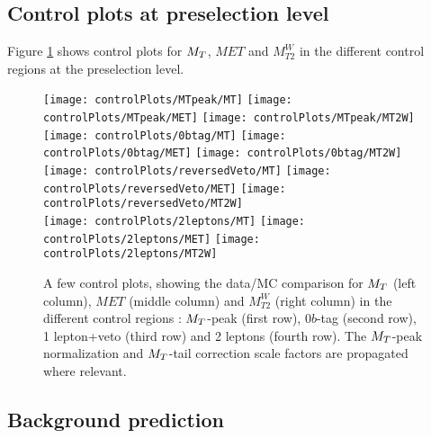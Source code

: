         \subsection{Control plots at preselection level}

        Figure \ref{fig:preselControlPlots} shows control plots for $M_T$, $MET$ and $M_{T2}^W$ in the different control regions at the preselection level.

            \begin{figure}[h!]
                \centering
                \texttt{[image: controlPlots/MTpeak/MT]}
                \texttt{[image: controlPlots/MTpeak/MET]}
                \texttt{[image: controlPlots/MTpeak/MT2W]}\\
                \texttt{[image: controlPlots/0btag/MT]}
                \texttt{[image: controlPlots/0btag/MET]}
                \texttt{[image: controlPlots/0btag/MT2W]}\\
                \texttt{[image: controlPlots/reversedVeto/MT]}
                \texttt{[image: controlPlots/reversedVeto/MET]}
                \texttt{[image: controlPlots/reversedVeto/MT2W]}\\
                \texttt{[image: controlPlots/2leptons/MT]}
                \texttt{[image: controlPlots/2leptons/MET]}
                \texttt{[image: controlPlots/2leptons/MT2W]}\\
                \caption{A few control plots, showing the data/MC comparison for $M_T$ (left column), 
                        $MET$ (middle column) and $M_{T2}^W$ (right column) in the different control
                        regions : $M_T$-peak (first row), $0b$-tag (second row), 1 lepton+veto (third
                        row) and 2 leptons (fourth row). The $M_T$-peak normalization and $M_T$-tail
                        correction scale factors are propagated where relevant.}
                        \label{fig:preselControlPlots}
            \end{figure}

        \subsection{Background prediction}

